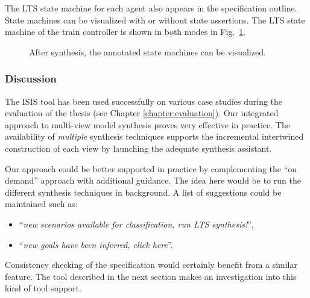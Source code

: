 The LTS state machine for each agent also appears in the specification outline. State machines can be visualized with or without state assertions. The LTS state machine of the train controller is shown in both modes in Fig.~\ref{image:isis-after}. 

\begin{figure}
\centering{}
  \caption{After synthesis, the annotated state machines can be visualized.\label{image:isis-after}}
\end{figure}

\subsubsection*{Discussion}

The ISIS tool has been used successfully on various case studies during the evaluation of the thesis (see Chapter \ref{chapter:evaluation}). Our integrated approach to multi-view model synthesis proves very effective in practice. The availability of \emph{multiple} synthesis techniques supports the incremental intertwined construction of each view by launching the adequate synthesis assistant.

Our approach could be better supported in practice by complementing the ``on demand'' approach with additional guidance. The idea here would be to run the different synthesis techniques in background. A list of suggestions could be maintained such as:
\begin{itemize}
\item ``\emph{new scenarios available for classification, run LTS synthesis!}'',
\item ``\emph{new goals have been inferred, click here}''. 
\end{itemize}
Consistency checking of the specification would certainly benefit from a similar feature. The tool described in the next section makes an investigation into this kind of tool support. 
